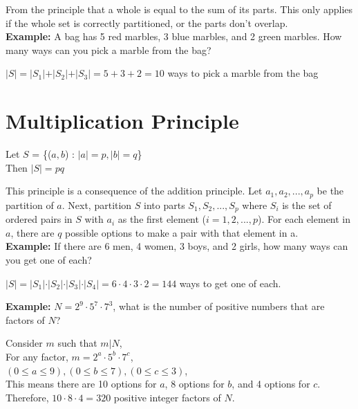 \documentclass[12pt, letterpaper]{article}
\begin{document}
From the principle that a whole is equal to the sum of its parts. This only applies if the whole set is correctly partitioned, or the parts don't overlap. \\

\textbf{Example:} A bag has 5 red marbles, 3 blue marbles, and 2 green marbles. How many ways can you pick a marble from the bag? \\
\begin{center}
  \(\vert S \vert = \vert S_1 \vert + \vert S_2 \vert + \vert S_3 \vert = 5 + 3 + 2 = 10\) ways to pick a marble from the bag\\
\end{center}

\section*{Multiplication Principle}
\begin{center}
  Let \(S\) = \{(\(a, b\)) : \(\vert a \vert = p, \vert b \vert = q\)\} \\
  Then \(\vert S \vert = pq\)
\end{center}
This principle is a consequence of the addition principle. Let \(a_1, a_2,...,a_p\) be the partition of \(a\). Next, partition \(S\) into parts \(S_1, S_2,..., S_p\) where \(S_i\) is the set of ordered pairs in \(S\) with \(a_i\) as the first element (\(i = 1, 2,..., p\)). For each element in \(a\), there are \(q\) possible options to make a pair with that element in a. \\

\textbf{Example:} If there are 6 men, 4 women, 3 boys, and 2 girls, how many ways can you get one of each? \\
\begin{center}
  \(\vert S \vert = \vert S_1 \vert \cdot \vert S_2 \vert \cdot \vert S_3 \vert \cdot \vert S_4 \vert = 6 \cdot 4 \cdot 3 \cdot 2 = 144\) ways to get one of each.
\end{center}

\textbf{Example:} \(N = 2^9 \cdot 5^7 \cdot 7^3\), what is the number of positive numbers that are factors of \(N\)?

\begin{center}
  Consider \(m\) such that \(m \vert N\), \\
  For any factor, \(m = 2^a \cdot 5^b \cdot 7^c \), \\
  \((0 \leq a \leq 9), (0 \leq b \leq 7), (0 \leq c \leq 3)\), \\
  This means there are 10 options for \(a\), 8 options for \(b\), and 4 options for \(c\). \\
  Therefore, \(10 \cdot 8 \cdot 4 = 320\) positive integer factors of \(N\).
\end{center}
\end{document}
